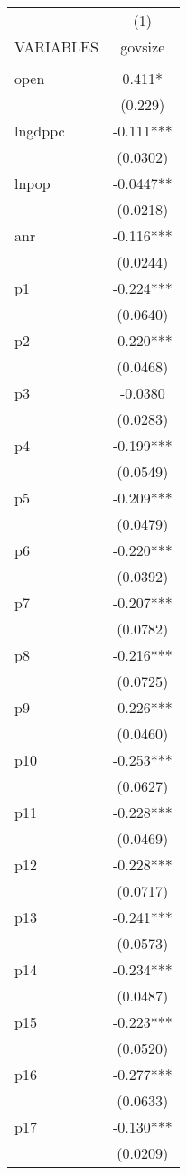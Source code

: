 \documentclass[]{article}
\begin{document}
\begin{tabular}{lc} \hline
 & (1) \\
VARIABLES & govsize \\ \hline
 &  \\
open & 0.411* \\
 & (0.229) \\
lngdppc & -0.111*** \\
 & (0.0302) \\
lnpop & -0.0447** \\
 & (0.0218) \\
anr & -0.116*** \\
 & (0.0244) \\
p1 & -0.224*** \\
 & (0.0640) \\
p2 & -0.220*** \\
 & (0.0468) \\
p3 & -0.0380 \\
 & (0.0283) \\
p4 & -0.199*** \\
 & (0.0549) \\
p5 & -0.209*** \\
 & (0.0479) \\
p6 & -0.220*** \\
 & (0.0392) \\
p7 & -0.207*** \\
 & (0.0782) \\
p8 & -0.216*** \\
 & (0.0725) \\
p9 & -0.226*** \\
 & (0.0460) \\
p10 & -0.253*** \\
 & (0.0627) \\
p11 & -0.228*** \\
 & (0.0469) \\
p12 & -0.228*** \\
 & (0.0717) \\
p13 & -0.241*** \\
 & (0.0573) \\
p14 & -0.234*** \\
 & (0.0487) \\
p15 & -0.223*** \\
 & (0.0520) \\
p16 & -0.277*** \\
 & (0.0633) \\
p17 & -0.130*** \\
 & (0.0209) \\

\end{tabular}
\end{document}
